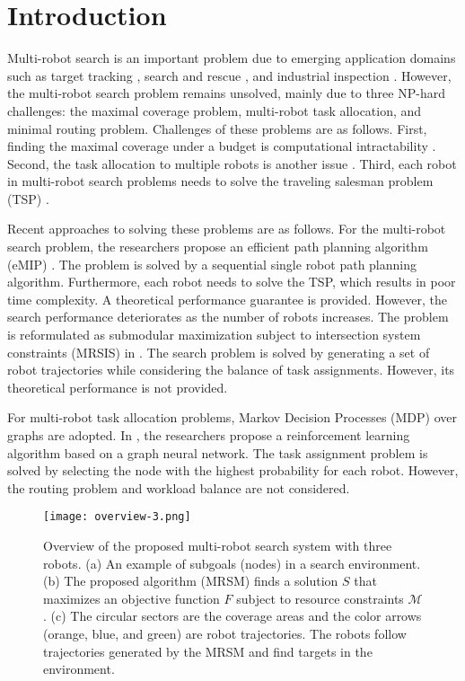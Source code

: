 \chapter{Introduction}

Multi-robot search is an important problem due to emerging application domains such as target tracking \cite{schlotfeldt2018anytime}, search and rescue \cite{jennings1997cooperative}, and industrial inspection \cite{correll2009multirobot}.
However, the multi-robot search problem remains unsolved, mainly due to three NP-hard challenges: the maximal coverage problem, multi-robot task allocation, and minimal routing problem.
Challenges of these problems are as follows.
First, finding the maximal coverage under a budget is computational intractability \cite{khuller1999budgeted}.
Second, the task allocation to multiple robots is another issue \cite{korsah2013comprehensive}.
Third, each robot in multi-robot search problems needs to solve the traveling salesman problem (TSP) \cite{zhang2016submodular}.

Recent approaches to solving these problems are as follows.
For the multi-robot search problem,
the researchers propose an efficient path planning algorithm (eMIP) \cite{singh2007efficient}.
The problem is solved by a sequential single robot path planning algorithm.
Furthermore, each robot needs to solve the TSP, which results in poor time complexity.
A theoretical performance guarantee is provided.
However, the search performance deteriorates as the number of robots increases.
The problem is reformulated as submodular maximization subject to intersection system constraints (MRSIS) in \cite{li2024mrsis}.
The search problem is solved by generating a set of robot trajectories while considering the balance of task assignments. However, its theoretical performance is not provided.

For multi-robot task allocation problems, Markov Decision Processes (MDP) over graphs are adopted.
In \cite{paull2022learning}, the researchers propose a reinforcement learning algorithm based on a graph neural network.
The task assignment problem is solved by selecting the node with the highest probability for each robot.
However, the routing problem and workload balance are not considered.

\begin{figure}[htbp]
\centerline{\texttt{[image: overview-3.png]}}
\caption{Overview of the proposed multi-robot search system with three robots.
(a) An example of subgoals (nodes) in a search environment.
(b) The proposed algorithm (MRSM) finds a solution $S$ that maximizes an objective function $F$ subject to resource constraints $\mathcal{M}$.
(c) The circular sectors are the coverage areas and the color arrows (orange, blue, and green) are robot trajectories. The robots follow trajectories generated by the MRSM and find targets in the environment.
}
\label{overview}
\end{figure}



